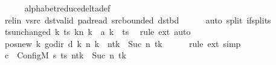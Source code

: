 \begin{isabellebody}
\ \ \ \ \isamarkupfalse%
\ alphabet{\isacharunderscore}{\kern0pt}reduce{\isacharunderscore}{\kern0pt}delta{\isacharunderscore}{\kern0pt}def\isanewline
\ \ \ \ \isamarkupfalse%
\ rel{\isacharunderscore}{\kern0pt}in\ vsrc\ dst{\isacharunderscore}{\kern0pt}valid\ pad{\isacharunderscore}{\kern0pt}read\ src{\isacharunderscore}{\kern0pt}bounded\ dst{\isacharunderscore}{\kern0pt}bd\isanewline
\ \ \ \ \isamarkupfalse%
\ {\isacharparenleft}{\kern0pt}auto\ split{\isacharcolon}{\kern0pt}\ if{\isacharunderscore}{\kern0pt}splits{\isacharparenright}{\kern0pt}\isanewline
\ \ \isamarkupfalse%
\ ts{\isacharunderscore}{\kern0pt}unchanged{\isacharcolon}{\kern0pt}\ {\isachardoublequoteopen}{\isacharparenleft}{\kern0pt}{\isasymlambda}k{\isachardot}{\kern0pt}\ {\isacharparenleft}{\kern0pt}ts\ k{\isacharparenright}{\kern0pt}{\isacharparenleft}{\kern0pt}n\ k\ {\isacharcolon}{\kern0pt}{\isacharequal}{\kern0pt}\ {\isacharquery}{\kern0pt}a\ k{\isacharparenright}{\kern0pt}{\isacharparenright}{\kern0pt}\ {\isacharequal}{\kern0pt}\ ts{\isachardoublequoteclose}\ \isamarkupfalse%
\ {\isacharparenleft}{\kern0pt}rule\ ext{\isacharparenright}{\kern0pt}\ auto\isanewline
\ \ \isamarkupfalse%
\ pos{\isacharunderscore}{\kern0pt}new{\isacharcolon}{\kern0pt}\ {\isachardoublequoteopen}{\isacharparenleft}{\kern0pt}{\isasymlambda}k{\isachardot}{\kern0pt}\ go{\isacharunderscore}{\kern0pt}dir\ {\isacharparenleft}{\kern0pt}{\isacharquery}{\kern0pt}d\ k{\isacharparenright}{\kern0pt}\ {\isacharparenleft}{\kern0pt}n\ k{\isacharparenright}{\kern0pt}{\isacharparenright}{\kern0pt}\ {\isacharequal}{\kern0pt}\ n{\isacharparenleft}{\kern0pt}tk\ {\isacharcolon}{\kern0pt}{\isacharequal}{\kern0pt}\ Suc\ {\isacharparenleft}{\kern0pt}n\ tk{\isacharparenright}{\kern0pt}{\isacharparenright}{\kern0pt}{\isachardoublequoteclose}\isanewline
\ \ \ \ \isamarkupfalse%
\ {\isacharparenleft}{\kern0pt}rule\ ext{\isacharparenright}{\kern0pt}\ simp\isanewline
\ \ \isamarkupfalse%
\ {\isacharquery}{\kern0pt}c{\isacharprime}{\kern0pt}{\isacharprime}{\kern0pt}\ {\isacharequal}{\kern0pt}\ {\isachardoublequoteopen}Config\isactrlsub M\ {\isacharquery}{\kern0pt}s{\isacharprime}{\kern0pt}\ ts\ {\isacharparenleft}{\kern0pt}n{\isacharparenleft}{\kern0pt}tk\ {\isacharcolon}{\kern0pt}{\isacharequal}{\kern0pt}\ Suc\ {\isacharparenleft}{\kern0pt}n\ tk{\isacharparenright}{\kern0pt}{\isacharparenright}{\kern0pt}{\isacharparenright}{\kern0pt}{\isachardoublequoteclose}\isanewline
\ \ \isamarkupfalse%

\end{isabellebody}
